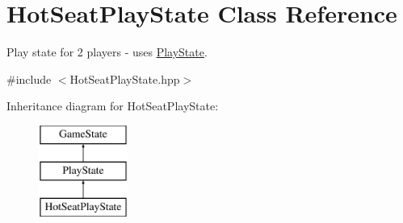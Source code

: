 \hypertarget{class_hot_seat_play_state}{}\section{Hot\+Seat\+Play\+State Class Reference}
\label{class_hot_seat_play_state}


Play state for 2 players -\/ uses \mbox{\hyperlink{class_play_state}{Play\+State}}.  




{\ttfamily \#include $<$Hot\+Seat\+Play\+State.\+hpp$>$}

Inheritance diagram for Hot\+Seat\+Play\+State\+:\begin{figure}[H]
\begin{center}
\leavevmode
\includegraphics[height=3.000000cm]{class_hot_seat_play_state}
\end{center}
\end{figure}
